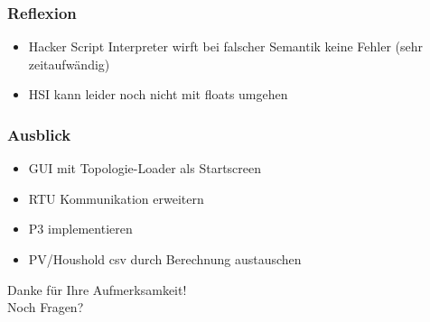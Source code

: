 \documentclass{beamer}
\begin{document}
\begin{frame}
	\frametitle{Reflexion}
	\begin{itemize}
		\item Hacker Script Interpreter wirft bei falscher Semantik keine Fehler (sehr zeitaufwändig)
		\item HSI kann leider noch nicht mit floats umgehen
	\end{itemize}
\end{frame}

\begin{frame}
	\frametitle{Ausblick}
	\begin{itemize}
		\item GUI mit Topologie-Loader als Startscreen
		\item RTU Kommunikation erweitern
		\item P3 implementieren
		\item PV/Houshold csv durch Berechnung austauschen
	\end{itemize}
\end{frame}

\begin{frame}
	\centering
	Danke für Ihre Aufmerksamkeit! \\
	Noch Fragen?
\end{frame}
\end{document}
